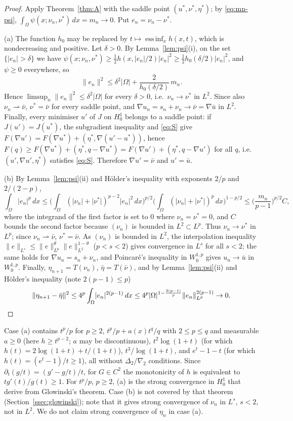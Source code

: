 \documentclass[11pt]{amsart}
\theoremstyle{definition}
\theoremstyle{remark}
\numberwithin{equation}{section}
\newcommand{\dx}{\,dx}
\newcommand{\abs}[1]{\lvert #1\rvert}
\newcommand{\norm}[1]{\lVert #1\rVert}
\newcommand{\weak}{\rightharpoonup}
\begin{document}
\begin{proof}
Apply Theorem~\ref{thm:A} with the saddle point $(u^*,\nu^*,\eta^*)$; by \eqref{eq:mn-psi}, $\int_\Omega\psi(x;\nu_n,\nu^*)\dx=m_n\to0$. Put $e_n=\nu_n-\nu^*$.

(a) The function $h_0$ may be replaced by $t\mapsto\operatorname*{ess\,inf}_xh(x,t)$, which is nondecreasing and positive. Let $\delta>0$. By Lemma~\ref{lem:psi}(i), on the set $\{\abs{e_n}>\delta\}$ we have $\psi(x;\nu_n,\nu^*)\ge\frac12h(x,\abs{e_n}/2)\abs{e_n}^2\ge\frac12h_0(\delta/2)\abs{e_n}^2$, and $\psi\ge0$ everywhere, so
\[
\norm{e_n}^2\le\delta^2\abs\Omega+\frac2{h_0(\delta/2)}\,m_n .
\]
Hence $\limsup_n\norm{e_n}^2\le\delta^2\abs\Omega$ for every $\delta>0$, i.e.\ $\nu_n\to\nu^*$ in $L^2$. Since also $\nu_n\weak\bar\nu$, $\nu^*=\bar\nu$ for every saddle point, and $\nabla u_n=s_n+\nu_n\to\bar\nu=\nabla\bar u$ in $L^2$. Finally, every minimiser $u'$ of $J$ on $H^1_0$ belongs to a saddle point: if $J(u')=J(u^*)$, the subgradient inequality and \eqref{eq:S} give $F(\nabla u')=F(\nabla u^*)+(\eta^*,\nabla(u'-u^*))$, hence $F(q)\ge F(\nabla u^*)+(\eta^*,q-\nabla u^*)=F(\nabla u')+(\eta^*,q-\nabla u')$ for all $q$, i.e.\ $(u',\nabla u',\eta^*)$ satisfies \eqref{eq:S}. Therefore $\nabla u'=\bar\nu$ and $u'=\bar u$.

(b) By Lemma~\ref{lem:psi}(ii) and H\"older's inequality with exponents $2/p$ and $2/(2-p)$,
\[
\int_\Omega\abs{e_n}^p\dx\le\Big(\int_\Omega(\abs{\nu_n}+\abs{\nu^*})^{p-2}\abs{e_n}^2\dx\Big)^{p/2}\Big(\int_\Omega(\abs{\nu_n}+\abs{\nu^*})^p\dx\Big)^{1-p/2}\le\Big(\frac{m_n}{p-1}\Big)^{p/2}C ,
\]
where the integrand of the first factor is set to $0$ where $\nu_n=\nu^*=0$, and $C$ bounds the second factor because $(\nu_n)$ is bounded in $L^2\subset L^p$. Thus $\nu_n\to\nu^*$ in $L^p$; since $\nu_n\weak\bar\nu$, $\nu^*=\bar\nu$. As $(\nu_n)$ is bounded in $L^2$, the interpolation inequality $\norm{e}_{L^s}\le\norm e_{L^p}^\theta\norm e_{L^2}^{1-\theta}$ ($p<s<2$) gives convergence in $L^s$ for all $s<2$; the same holds for $\nabla u_n=s_n+\nu_n$, and Poincar\'e's inequality in $W^{1,p}_0$ gives $u_n\to\bar u$ in $W^{1,p}_0$. Finally, $\eta_{n+1}=T(\nu_n)$, $\bar\eta=T(\bar\nu)$, and by Lemma~\ref{lem:psi}(ii) and H\"older's inequality (note $2(p-1)\le p$)
\[
\norm{\eta_{n+1}-\bar\eta}^2\le4^p\int_\Omega\abs{e_n}^{2(p-1)}\dx\le4^p\abs\Omega^{1-\frac{2(p-1)}p}\norm{e_n}_{L^p}^{2(p-1)}\to0 .\qedhere
\]
\end{proof}

Case (a) contains $t^p/p$ for $p\ge2$, $t^p/p+a(x)t^q/q$ with $2\le p\le q$ and measurable $a\ge0$ (here $h\ge t^{p-2}$; $a$ may be discontinuous), $t^2\log(1+t)$ (for which $h(t)=2\log(1+t)+t/(1+t)$), $t^3/\log(1+t)$, and $e^t-1-t$ (for which $h(t)=(e^t-1)/t\ge1$), all without $\Delta_2$/$\nabla_2$ conditions. Since $\partial_t(g/t)=(g'-g/t)/t$, for $G\in C^2$ the monotonicity of $h$ is equivalent to $tg'(t)/g(t)\ge1$. For $t^p/p$, $p\ge2$, (a) is the strong convergence in $H^1_0$ that \cite{AragonFBRubio2023} derive from Glowinski's theorem. Case (b) is not covered by that theorem (Section~\ref{ssec:glowinski}); note that it gives strong convergence of $\nu_n$ in $L^s$, $s<2$, not in $L^2$. We do not claim strong convergence of $\eta_n$ in case (a).
\end{document}

